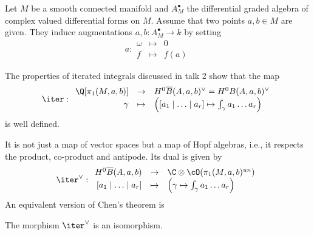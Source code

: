 Let $M$ be a smooth connected manifold and $A^{\bullet}_M$ the differential graded algebra of complex valued differential forms on $M$. 
Assume that two points $a, b \in M$ are given. 
They induce augmentations $a,b : A_M^\bullet \to k$ by setting  
\[
a : 
\begin{array}{rcl} 
\omega & \mapsto & 0 \\
f  & \mapsto & f(a) 
\end{array}
\]

\begin{defn}[Iter]\label{def:iter}
The properties of iterated integrals discussed in talk 2 show that the map 
\[
\iter : 
\begin{array}{rcl}
\Q[\pi_1(M, a, b)] & \to & H^0 \overline{B}(A, a, b)^{\vee} = H^0 B(A, a, b)^\vee \\
\gamma & \mapsto & \left( [a_1 \mid \ldots \mid a_r] \mapsto \int_{\gamma} a_1 \ldots a_r \right)
\end{array}
\]
is well defined. 
\end{defn}
It is not just a map of vector spaces but a map of Hopf algebras, i.e., it respects the product, co-product and antipode. Its dual is given by
\[
\iter^{\vee} : \begin{array}{rcl}
H^0 \overline{B}(A, a, b) & \to & \C \otimes \cO( \pi_1(M, a, b)^{un}) \\
\textrm{$[a_1 \mid \ldots \mid a_r]$} & \mapsto & \left( \gamma \mapsto \int_{\gamma} a_1 \ldots a_r \right)
\end{array}
\]
An equivalent version of Chen's theorem is 
\begin{thm}[Chen]
The morphism $\iter^{\vee}$ is an isomorphism.
\end{thm}



